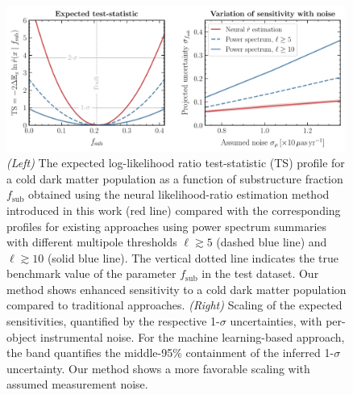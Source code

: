 \documentclass[twocolumn,linenumbers]{aastex631}
\begin{document}
\begin{figure}[!htbp]
\centering
\includegraphics[width=0.99\textwidth]{results}
\caption{\emph{(Left)} The expected log-likelihood ratio test-statistic (TS) profile for a cold dark matter population as a function of substructure fraction $f_\mathrm{sub}$ obtained using the neural likelihood-ratio estimation method introduced in this work (red line) compared with the corresponding profiles for existing approaches using power spectrum summaries with different multipole thresholds $\ell \gtrsim 5$ (dashed blue line) and $\ell \gtrsim 10$ (solid blue line). The vertical dotted line indicates the true benchmark value of the parameter $f_\mathrm{sub}$ in the test dataset. Our method shows enhanced sensitivity to a cold dark matter population compared to traditional approaches. \emph{(Right)} Scaling of the expected sensitivities, quantified by the respective 1-$\sigma$ uncertainties, with per-object instrumental noise. For the machine learning-based approach, the band quantifies the middle-95\% containment of the inferred 1-$\sigma$ uncertainty. Our method shows a more favorable scaling with assumed measurement noise.}
\label{fig:experiment}
\end{figure}
\end{document}

